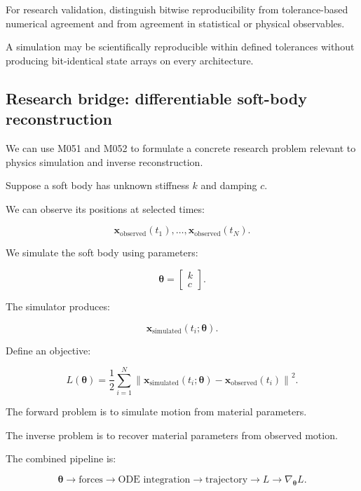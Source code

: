 For research validation, distinguish bitwise reproducibility from tolerance-based numerical agreement and from agreement in statistical or physical observables.

A simulation may be scientifically reproducible within defined tolerances without producing bit-identical state arrays on every architecture.

\subsection{Research bridge: differentiable soft-body reconstruction}\label{02-foundations-ii-ch022-research-bridge-differentiable-soft-body-reconstruction}

\hypertarget{02-foundations-ii-ch022-research-bridge-differentiable-soft-body-reconstruction}{}

We can use M051 and M052 to formulate a concrete research problem relevant to physics simulation and inverse reconstruction.

Suppose a soft body has unknown stiffness \(k\) and damping \(c\).

We can observe its positions at selected times:

\[
\mathbf x_{\mathrm{observed}}(t_1),\ldots, \mathbf x_{\mathrm{observed}}(t_N).
\]

We simulate the soft body using parameters:

\[
\boldsymbol\theta= \begin{bmatrix} k\\c \end{bmatrix}.
\]

The simulator produces:

\[
\mathbf x_{\mathrm{simulated}}(t_i;\boldsymbol\theta).
\]

Define an objective:

\[
\boxed{ L(\boldsymbol\theta)= \frac12\sum_{i=1}^{N} \left\| \mathbf x_{\mathrm{simulated}}(t_i;\boldsymbol\theta) - \mathbf x_{\mathrm{observed}}(t_i) \right\|^2 }.
\]

The forward problem is to simulate motion from material parameters.

The inverse problem is to recover material parameters from observed motion.

The combined pipeline is:

\[
\boldsymbol\theta \rightarrow \text{forces} \rightarrow \text{ODE integration} \rightarrow \text{trajectory} \rightarrow L \rightarrow \nabla_{\boldsymbol\theta}L.
\]


